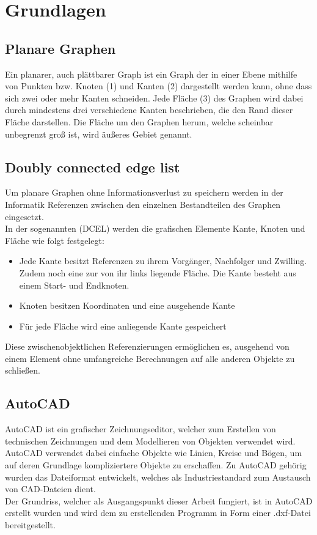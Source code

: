 \chapter{Grundlagen}
\section{Planare Graphen}
Ein planarer, auch plättbarer Graph ist ein Graph der in einer Ebene mithilfe von Punkten bzw. Knoten (1) und Kanten (2) dargestellt werden kann, ohne dass sich zwei oder mehr Kanten schneiden. 
Jede Fläche (3) des Graphen wird dabei durch mindestens drei verschiedene Kanten beschrieben, die den Rand dieser Fläche darstellen. 
Die Fläche um den Graphen herum, welche scheinbar unbegrenzt groß ist, wird äußeres Gebiet genannt.
\section{Doubly connected edge list}
Um planare Graphen ohne Informationsverlust zu speichern werden in der Informatik Referenzen zwischen den einzelnen Bestandteilen des Graphen eingesetzt. \\
In der sogenannten  (DCEL) werden die grafischen Elemente Kante, Knoten und Fläche wie folgt festgelegt:
\begin{itemize}
	\item Jede Kante besitzt Referenzen zu ihrem Vorgänger, Nachfolger und Zwilling. Zudem noch eine zur von ihr links liegende Fläche. Die Kante besteht aus einem Start- und Endknoten.
	\item Knoten besitzen Koordinaten und eine ausgehende Kante
	\item Für jede Fläche wird eine anliegende Kante gespeichert
\end{itemize}
Diese zwischenobjektlichen Referenzierungen ermöglichen es, ausgehend von einem Element ohne umfangreiche Berechnungen auf alle anderen Objekte zu schließen.
\section{AutoCAD}
AutoCAD ist ein grafischer Zeichnungseditor, welcher zum Erstellen von technischen Zeichnungen und dem Modellieren von Objekten verwendet wird.
AutoCAD verwendet dabei einfache Objekte wie Linien, Kreise und Bögen, um auf deren Grundlage kompliziertere Objekte zu erschaffen.
Zu AutoCAD gehörig wurden das Dateiformat  entwickelt, welches als Industriestandard zum Austausch von CAD-Dateien dient. \\
Der Grundriss, welcher als Ausgangspunkt dieser Arbeit fungiert, ist in AutoCAD erstellt wurden und wird dem zu erstellenden Programm in Form einer .dxf-Datei bereitgestellt.
